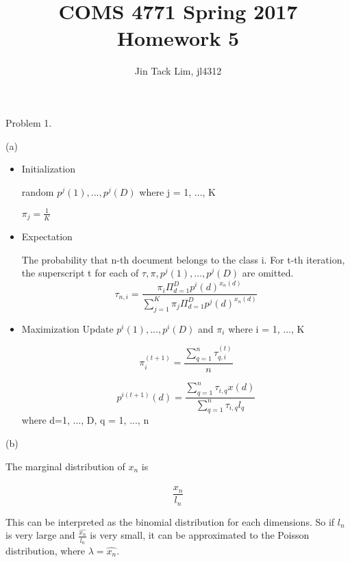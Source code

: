 \documentclass[11pt]{article}
\title{COMS 4771 Spring 2017 Homework 5}
\author{Jin Tack Lim, jl4312
  }
\date{%
  }
\theoremstyle{definition}
\begin{document}
\maketitle



Problem 1.

(a) 

\begin{itemize}
\item Initialization

random $p^j(1), ..., p^j(D)$ where j = {1, ..., K}

$\pi_j = \frac{1}{K}$

\item Expectation

The probability that n-th document belongs to the class i.
For t-th iteration, the superscript t for each of $\tau, \pi, p^j(1), ..., p^j(D)$ are omitted.
\begin{equation*}
\tau_{n,i} = \frac{\pi_i \Pi_{d=1}^{D} p^i(d)^{x_n(d)}}{\sum_{j=1}^{K} \pi_j \Pi_{d=1}^{D} p^j(d)^{x_n(d)}}
\end{equation*}

\item Maximization
Update $p^i(1), ..., p^i(D)$ and $\pi_i$ where i = {1, ..., K}

\begin{equation*}
\pi_i^{(t+1)} = \frac{\sum_{q=1}^n \tau^{(t)}_{q, i}}{n}
\end{equation*}

\begin{equation*}
p^{i(t+1)}(d) = \frac{\sum_{q=1}^n \tau_{i,q} x(d)}{\sum_{q=1}^n \tau_{i,q} l_q}
\end{equation*}
where d={1, ..., D}, q = {1, ..., n}
\end{itemize}

(b)

The marginal distribution of $x_n$ is

\begin{equation*}
\frac{\hat{x_n}}{l_n}
\end{equation*}

This can be interpreted as the binomial distribution for each dimensions. So if
$l_n$ is very large and $\frac{\hat{x_n}}{l_n}$ is very small, it can be
approximated to the Poisson distribution, where $\lambda = \hat{x_n}$.
\end{document}
